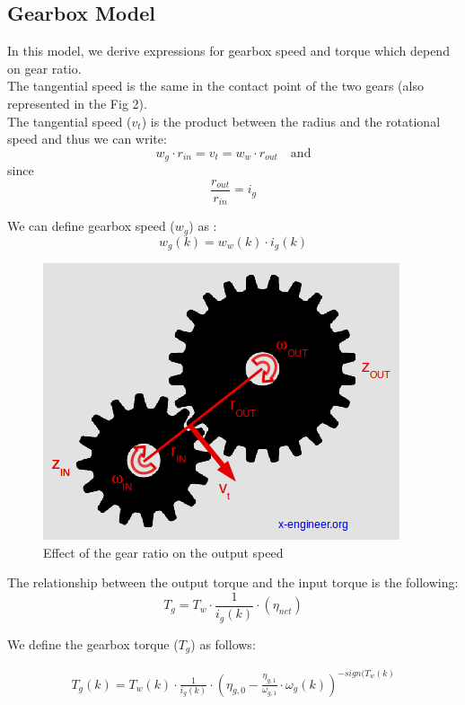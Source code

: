 \documentclass[conference]{IEEEtran}
\begin{document}
\vspace{10pt}
\subsection{Gearbox Model}
In this model, we derive expressions for gearbox speed and torque which depend on gear ratio. \\

The tangential speed is the same in the contact point of the two gears (also represented in the Fig 2). \\

The tangential speed ($v_t$) is the product between the radius and the rotational speed and thus we can write: \\

\[
w_g \cdot r_{in} = v_t = w_w \cdot r_{out} \quad \text{and}
\]
since
\[ \frac{r_{out}}{r_{in}} = i_g
\]

We can define gearbox speed ($w_g$) as :
\begin{equation}\label{eq1}
w_g(k) = w_w(k) \cdot i_g(k)
\end{equation}


\begin{figure}[h]
    \centering
    \includegraphics[scale = 0.45]{gearbox model.png}
    \caption{Effect of the gear ratio on the output speed}
    \label{fig:}
\end{figure}

The relationship between the output torque and the input torque is the following:
\[T_g = T_w \cdot \frac{1}{i_g(k)} \cdot ({\eta_{net}})
\]

We define the gearbox torque ($T_g$) as follows:

\begin{multline}
T_g(k) = T_w(k) \cdot \frac{1}{i_g(k)} \cdot {(\eta_{g,0} - \frac{\eta_{g,1}}{\omega_{g,1} } \cdot \omega_g(k))^{-sign(T_w(k)}}
\end{multline}
\end{document}
